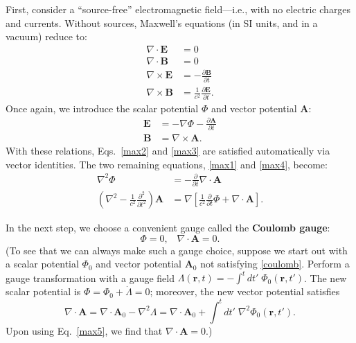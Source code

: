 \documentclass[pra,12pt]{revtex4}
\begin{document}
First, consider a ``source-free'' electromagnetic field---i.e., with
no electric charges and currents.  Without sources, Maxwell's
equations (in SI units, and in a vacuum) reduce to:
\begin{align}
  \nabla\cdot \mathbf{E} &= 0 \label{max1} \\
  \nabla\cdot \mathbf{B} &= 0 \label{max2}\\
  \nabla\times \mathbf{E} &= -\frac{\partial \mathbf{B}}{\partial t} \label{max3}\\
  \nabla\times \mathbf{B} &= \frac{1}{c^2} \frac{\partial \mathbf{E}}{\partial t}.
  \label{max4}
\end{align}
Once again, we introduce the scalar potential $\Phi$ and vector
potential $\mathbf{A}$:
\begin{align}
  \mathbf{E} &= - \nabla \Phi - \frac{\partial\mathbf{A}}{\partial t}
  \label{Efield} \\
  \mathbf{B} &= \nabla \times \mathbf{A}.
  \label{Bfield}
\end{align}
With these relations, Eqs.~\eqref{max2} and \eqref{max3} are satisfied
automatically via vector identities.  The two remaining equations,
\eqref{max1} and \eqref{max4}, become:
\begin{align}
  \nabla^2 \Phi &= -\frac{\partial}{\partial t} \nabla \cdot \mathbf{A} \label{max5} \\
  \left(\nabla^2 - \frac{1}{c^2}\frac{\partial^2}{\partial t^2}\right)
  \mathbf{A} &= \nabla\left[\frac{1}{c^2}\frac{\partial}{\partial t}  \Phi + \nabla\cdot\mathbf{A}\right]. \label{max6}
\end{align}

In the next step, we choose a convenient gauge called the
\textbf{Coulomb gauge}:
\begin{equation}
  \Phi = 0, \;\;\; \nabla \cdot \mathbf{A} = 0.
  \label{coulomb}
\end{equation}
(To see that we can always make such a gauge choice, suppose we start
out with a scalar potential $\Phi_0$ and vector potential
$\mathbf{A}_0$ not satisfying \eqref{coulomb}.  Perform a gauge
transformation with a gauge field $\Lambda(\mathbf{r}, t) = - \int^t
dt'\; \Phi_0(\mathbf{r}, t')$.  The new scalar potential is $\Phi =
\Phi_0 + \dot{\Lambda} = 0$; moreover, the new vector potential
satisfies
\begin{equation}
  \nabla\cdot\mathbf{A} = \nabla\cdot \mathbf{A}_0 - \nabla^2 \Lambda
  = \nabla\cdot \mathbf{A}_0 + \int^t dt'\; \nabla^2\Phi_0(\mathbf{r}, t').
\end{equation}
Upon using Eq.~\eqref{max5}, we find that $\nabla\cdot\mathbf{A} =
0$.)
\end{document}
